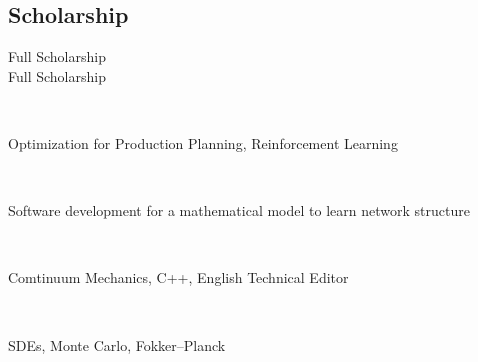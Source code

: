 \documentclass[a4paper]{MagicalCV}
\begin{document}
\begin{minipage}[t]{0.66\textwidth}
\subsection{Scholarship}
\vspace{\topsep} %
Full Scholarship\\
\vspace{\topsep} %
Full Scholarship\\
\sectionsep


\end{minipage} 
\hfill
\begin{minipage}[t]{0.33\textwidth} 


 \\
\vspace{\topsep} %
\begin{tightemize}
\item Optimization for Production Planning, Reinforcement Learning
\end{tightemize}
\sectionsep

 \\
\vspace{\topsep} %
\begin{tightemize}
\item  Software development for a mathematical model to learn network structure
\end{tightemize}
\sectionsep

 \\
\vspace{\topsep} %
\begin{tightemize}
\item  Comtinuum Mechanics, C++, English Technical Editor
\end{tightemize}
\sectionsep

 \\
\vspace{\topsep} %
\begin{tightemize}
\item  SDEs, Monte Carlo, Fokker–Planck
\end{tightemize}
\sectionsep


\end{minipage}
\end{document}
